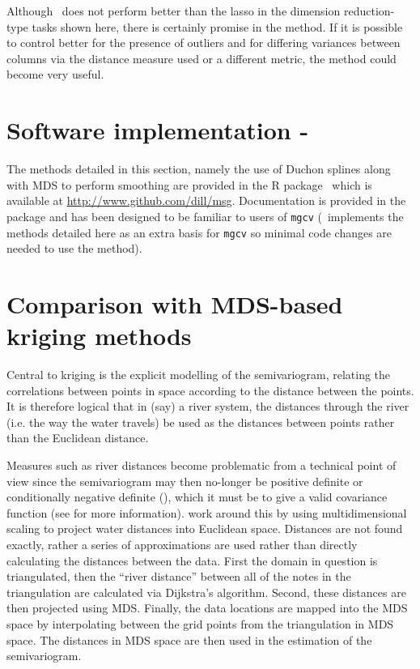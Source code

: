 Although \mdsds\ does not perform better than the lasso in the dimension reduction-type tasks shown here, there is certainly promise in the method. If it is possible to control better for the presence of outliers and for differing variances between columns via the distance measure used or a different metric, the method could become very useful.


\section{Software implementation - \mdspack}
\label{gds-software}

The methods detailed in this section, namely the use of Duchon splines along with MDS to perform smoothing are provided in the \textsf{R} package \mdspack\ which is available at \url{http://www.github.com/dill/msg}. Documentation is provided in the package and has been designed to be familiar to users of \texttt{mgcv} (\mdspack\ implements the methods detailed here as an extra basis for \texttt{mgcv} so minimal code changes are needed to use the method).

\section{Comparison with MDS-based kriging methods}
\label{gds-krig}

Central to kriging is the explicit modelling of the semivariogram, relating the correlations between points in space according to the distance between the points. It is therefore logical that in (say) a river system, the distances through the river (i.e. the way the water travels) be used as the distances between points rather than the Euclidean distance. 

Measures such as river distances become problematic from a technical point of view since the semivariogram may then no-longer be positive definite or conditionally negative definite (), which it must be to give a valid covariance function (see \cite[p. 47]{diggle} for more information).   work around this by using multidimensional scaling to project water distances into Euclidean space. Distances are not found exactly, rather a series of approximations are used rather than directly calculating the distances between the data. First the domain in question is triangulated, then the ``river distance'' between all of the notes in the triangulation are calculated via Dijkstra's algorithm. Second, these distances are then projected using MDS. Finally, the data locations are mapped into the MDS space by interpolating between the grid points from the triangulation in MDS space.  The distances in MDS space are then used in the estimation of the semivariogram.

